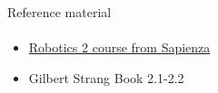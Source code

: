\documentclass[aspectratio=169]{beamer}
\newcommand{\fbckg}[1]{\usebackgroundtemplate{\texttt{[image: \#1]}}}%
\begin{document}
\begin{frame}[t]{Reference material}
    \framesubtitle{}
    \Large
    \begin{itemize}
        \item \href{http://diag.uniroma1.it/~deluca/rob2_en.php}{Robotics 2 course from Sapienza}
        \item Gilbert Strang Book 2.1-2.2
    \end{itemize}
\end{frame}

\fbckg{fibeamer/figs/last_page.png}
\frame[plain]{}
\end{document}
